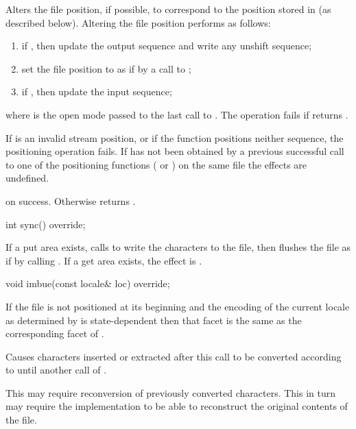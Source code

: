 \begin{itemdescr}
\pnum
Alters the file position, if possible, to correspond to the position
stored in  (as described below).
Altering the file position performs as follows:
\begin{enumerate}
\item
if
,
then update the output sequence and
write any unshift sequence;
\item
set the file position to  as if by a call to ;
\item
if
,
then update the input sequence;
\end{enumerate}
where  is the open mode passed to the last call to
.
The operation fails if
returns .

\pnum
If  is an invalid stream position, or if the function positions
neither sequence, the positioning operation fails.
If  has not been obtained by a previous successful call to one of
the positioning functions
(
or
)
on the same file the effects are undefined.

\pnum
\returns
{}
on success.
Otherwise returns
.
\end{itemdescr}

%
\begin{itemdecl}
int sync() override;
\end{itemdecl}

\begin{itemdescr}
\pnum
\effects
If a put area exists, calls
to write the characters to the file,
then flushes the file as if by calling .
If a get area exists, the effect is .
\end{itemdescr}

%
\begin{itemdecl}
void imbue(const locale& loc) override;
\end{itemdecl}

\begin{itemdescr}
\pnum
\expects
If the file is not positioned at its beginning and the encoding of the current
locale as determined by
is state-dependent
then that facet is the same as
the corresponding facet of .

\pnum
\effects
Causes characters inserted or extracted after this call
to be converted according to  until another call of
.

\pnum
\remarks
This may require reconversion of previously converted characters.
This in turn may require the implementation to be able to reconstruct
the original contents of the file.
\end{itemdescr}

